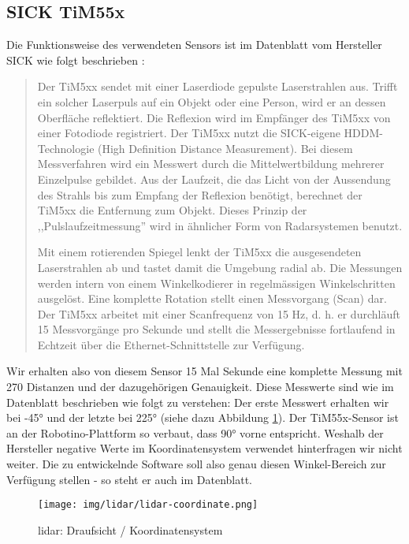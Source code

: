 \subsection{SICK TiM55x}
\label{chap:tim55x}
Die Funktionsweise des verwendeten Sensors ist im Datenblatt vom Hersteller SICK wie folgt beschrieben \cite{tim55x-techinfo}:
\begin{quote}
Der TiM5xx sendet mit einer Laserdiode gepulste Laserstrahlen aus. Trifft ein solcher Laserpuls auf ein Objekt oder eine Person, wird er an dessen Oberfläche reflektiert. Die Reflexion wird im Empfänger des TiM5xx von einer Fotodiode registriert. Der TiM5xx nutzt die SICK-eigene HDDM-Technologie (High Definition Distance Measurement). Bei diesem Messverfahren wird ein Messwert durch die Mittelwertbildung mehrerer Einzelpulse gebildet. Aus der Laufzeit, die das Licht von der Aussendung des Strahls bis zum Empfang der Reflexion benötigt, berechnet der TiM5xx die Entfernung zum Objekt. Dieses Prinzip der ,,Pulslaufzeitmessung'' wird in ähnlicher Form von Radarsystemen benutzt.

Mit einem rotierenden Spiegel lenkt der TiM5xx die ausgesendeten Laserstrahlen ab und tastet damit die Umgebung radial ab. Die Messungen werden intern von einem Winkelkodierer in regelmässigen Winkelschritten ausgelöst. Eine komplette Rotation stellt einen Messvorgang (Scan) dar. Der TiM5xx arbeitet mit einer Scanfrequenz von 15 Hz, d. h. er durchläuft 15 Messvorgänge pro Sekunde und stellt die Messergebnisse fortlaufend in Echtzeit über die Ethernet-Schnittstelle zur Verfügung.
\end{quote}

Wir erhalten also von diesem Sensor 15 Mal Sekunde eine komplette Messung mit 270 Distanzen und der dazugehörigen Genauigkeit. Diese Messwerte sind wie im Datenblatt beschrieben wie folgt zu verstehen: Der erste Messwert erhalten wir bei -45° und der letzte bei 225° (siehe dazu Abbildung \ref{fig:lidar}). Der TiM55x-Sensor ist an der Robotino-Plattform so verbaut, dass 90° vorne entspricht. Weshalb der Hersteller negative Werte im Koordinatensystem verwendet hinterfragen wir nicht weiter. Die zu entwickelnde Software soll also genau diesen Winkel-Bereich zur Verfügung stellen - so steht er auch im Datenblatt.
\begin{figure}[H]
	\centering
	\texttt{[image: img/lidar/lidar-coordinate.png]}
	\caption{\acrshort{lidar}: Draufsicht / Koordinatensystem}
	\label{fig:lidar}
\end{figure}
